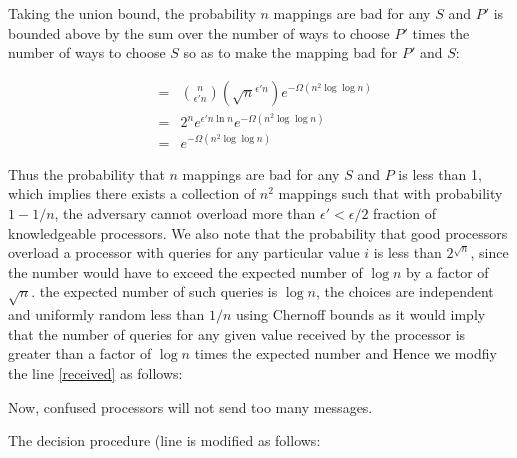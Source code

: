 \documentclass{sig-alternate}
\begin{document}
{Taking the union bound, the probability $n$ mappings are bad for any $S$ and $P'$ is  bounded above by the sum over the number of ways to choose $P'$ times the number of ways to choose $S$ so as to make the mapping bad for $P'$ and $S$:

\begin{eqnarray}
& = & {n \choose \epsilon' n} (\sqrt{n}^{\epsilon' n})        e^{-\Omega ( n^2 \log \log n)} \\
& = & 2^n e^{ \epsilon' n \ln n}  e^{-\Omega ( n^2 \log \log n)} \\
& = & e^{-\Omega ( n^2 \log \log n)}
\end{eqnarray}

Thus the probability that $n$ mappings are bad for any $S$ and $P$ is less than 1, which implies there exists
a collection of $n^2$  mappings such that with probability $1-1/n$, the adversary cannot overload more than $\epsilon'< \epsilon/2 $ fraction of knowledgeable processors.  We also note that the probability that good processors overload a processor with queries for any particular value
$i$  is less than $2^{\sqrt{n}}$, since the number would have to exceed the expected number of $\log n$ by
a factor of $\sqrt{n}$. the expected number of such queries is $\log n$, the choices are independent and uniformly random less than 
$1/n$ using Chernoff bounds as it would imply that the number of queries for any given value received by the processor is
greater than a factor of $ \log n$ times the expected number and
Hence we  modfiy the line \ref{received} as follows:

Now, confused processors will not send too many messages. 

The decision procedure (line \label{majority} is modified as follows:
}
\end{document}
